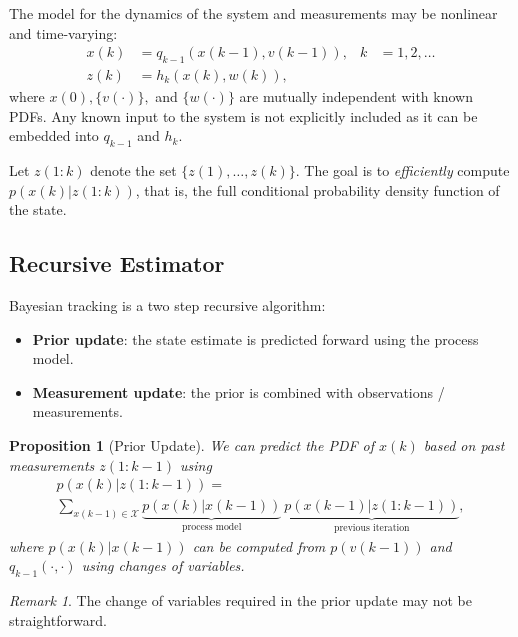 \documentclass[margin=small]{hsrzf}
\theoremstyle{plain}
\newtheorem{prop}{Proposition}[section]
\theoremstyle{definition}
\theoremstyle{remark}
\newtheorem*{remark}{Remark}
\begin{document}
The model for the dynamics of the system and measurements may be nonlinear and
time-varying:
\begin{align*}
  x(k) &= q_{k-1}(x(k-1), v(k-1)), & k&=1,2,\ldots \\
  z(k) &= h_k(x(k), w(k)),
\end{align*}
where $x(0), \{v(\cdot)\},$ and $\{w(\cdot)\}$ are mutually independent with
known PDFs. Any known input to the system is not explicitly included as it can
be embedded into $q_{k-1}$ and $h_k$.

Let $z(1:k)$ denote the set $\{z(1), \ldots, z(k)\}$. The goal is to
\emph{efficiently} compute $p(x(k) | z(1:k))$, that is, the full conditional
probability density function of the state.

\subsection{Recursive Estimator}

Bayesian tracking is a two step recursive algorithm:
\begin{itemize}
  \item \textbf{Prior update}: the state estimate is predicted forward using
    the process model.
  \item \textbf{Measurement update}: the prior is combined with observations /
    measurements.
\end{itemize}

\begin{prop}[Prior Update]
  We can predict the PDF of $x(k)$ based on past measurements $z(1:k-1)$ using
  \begin{gather*}
    p(x(k)|z(1:k-1)) = \\
      \sum_{x(k-1) \in \mathcal{X}}
      \underbrace{p(x(k) | x(k-1))}_{\text{process model}} ~
      \underbrace{p(x(k-1) | z(1:k-1))}_{\text{previous iteration}},
  \end{gather*}
  where $p(x(k) | x(k-1))$ can be computed from $p(v(k-1))$ and
  $q_{k-1}(\cdot, \cdot)$ using changes of variables.
\end{prop}

\begin{remark}
  The change of variables required in the prior update may not be
  straightforward.
\end{remark}
\end{document}
